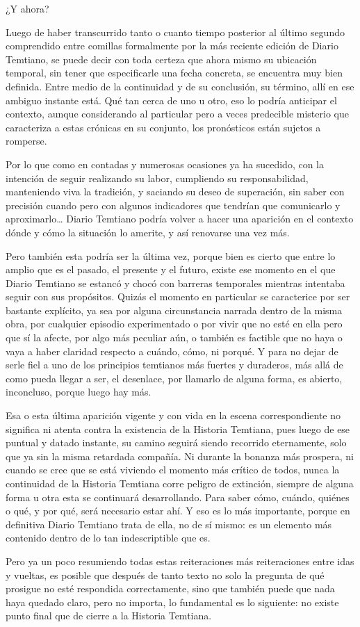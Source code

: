 \documentclass[
  spanish,
]{book}
\begin{document}
¿Y ahora?

Luego de haber transcurrido tanto o cuanto tiempo posterior al último segundo comprendido entre comillas formalmente por la más reciente edición de Diario Temtiano, se puede decir con toda certeza que ahora mismo su ubicación temporal, sin tener que especificarle una fecha concreta, se encuentra muy bien definida. Entre medio de la continuidad y de su conclusión, su término, allí en ese ambiguo instante está. Qué tan cerca de uno u otro, eso lo podría anticipar el contexto, aunque considerando al particular pero a veces predecible misterio que caracteriza a estas crónicas en su conjunto, los pronósticos están sujetos a romperse.

Por lo que como en contadas y numerosas ocasiones ya ha sucedido, con la intención de seguir realizando su labor, cumpliendo su responsabilidad, manteniendo viva la tradición, y saciando su deseo de superación, sin saber con precisión cuando pero con algunos indicadores que tendrían que comunicarlo y aproximarlo\ldots{} Diario Temtiano podría volver a hacer una aparición en el contexto dónde y cómo la situación lo amerite, y así renovarse una vez más.

Pero también esta podría ser la última vez, porque bien es cierto que entre lo amplio que es el pasado, el presente y el futuro, existe ese momento en el que Diario Temtiano se estancó y chocó con barreras temporales mientras intentaba seguir con sus propósitos. Quizás el momento en particular se caracterice por ser bastante explícito, ya sea por alguna circunstancia narrada dentro de la misma obra, por cualquier episodio experimentado o por vivir que no esté en ella pero que sí la afecte, por algo más peculiar aún, o también es factible que no haya o vaya a haber claridad respecto a cuándo, cómo, ni porqué. Y para no dejar de serle fiel a uno de los principios temtianos más fuertes y duraderos, más allá de como pueda llegar a ser, el desenlace, por llamarlo de alguna forma, es abierto, inconcluso, porque luego hay más.

Esa o esta última aparición vigente y con vida en la escena correspondiente no significa ni atenta contra la existencia de la Historia Temtiana, pues luego de ese puntual y datado instante, su camino seguirá siendo recorrido eternamente, solo que ya sin la misma retardada compañía. Ni durante la bonanza más prospera, ni cuando se cree que se está viviendo el momento más crítico de todos, nunca la continuidad de la Historia Temtiana corre peligro de extinción, siempre de alguna forma u otra esta se continuará desarrollando. Para saber cómo, cuándo, quiénes o qué, y por qué, será necesario estar ahí. Y eso es lo más importante, porque en definitiva Diario Temtiano trata de ella, no de sí mismo: es un elemento más contenido dentro de lo tan indescriptible que es.

Pero ya un poco resumiendo todas estas reiteraciones más reiteraciones entre idas y vueltas, es posible que después de tanto texto no solo la pregunta de qué prosigue no esté respondida correctamente, sino que también puede que nada haya quedado claro, pero no importa, lo fundamental es lo siguiente: no existe punto final que de cierre a la Historia Temtiana.
\end{document}
